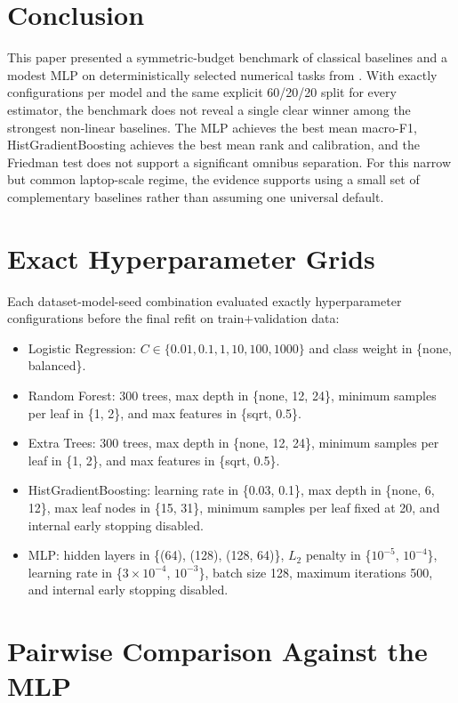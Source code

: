 \documentclass{ieeeaccess}
\begin{document}
\section{Conclusion}
This paper presented a symmetric-budget benchmark of classical baselines and a modest MLP on deterministically selected numerical tasks from \BenchmarkSuiteName{}. With exactly \SearchConfigsPerModel{} configurations per model and the same explicit 60/20/20 split for every estimator, the benchmark does not reveal a single clear winner among the strongest non-linear baselines. The MLP achieves the best mean macro-F1, HistGradientBoosting achieves the best mean rank and calibration, and the Friedman test does not support a significant omnibus separation. For this narrow but common laptop-scale regime, the evidence supports using a small set of complementary baselines rather than assuming one universal default.

\appendices
\section{Exact Hyperparameter Grids}
Each dataset-model-seed combination evaluated exactly \SearchConfigsPerModel{} hyperparameter configurations before the final refit on train$+$validation data:
\begin{itemize}
\item Logistic Regression: $C \in \{0.01, 0.1, 1, 10, 100, 1000\}$ and class weight in \{none, balanced\}.
\item Random Forest: 300 trees, max depth in \{none, 12, 24\}, minimum samples per leaf in \{1, 2\}, and max features in \{sqrt, 0.5\}.
\item Extra Trees: 300 trees, max depth in \{none, 12, 24\}, minimum samples per leaf in \{1, 2\}, and max features in \{sqrt, 0.5\}.
\item HistGradientBoosting: learning rate in \{0.03, 0.1\}, max depth in \{none, 6, 12\}, max leaf nodes in \{15, 31\}, minimum samples per leaf fixed at 20, and internal early stopping disabled.
\item MLP: hidden layers in \{(64), (128), (128, 64)\}, $L_2$ penalty in \{$10^{-5}$, $10^{-4}$\}, learning rate in \{$3 \times 10^{-4}$, $10^{-3}$\}, batch size 128, maximum iterations 500, and internal early stopping disabled.
\end{itemize}

\section{Pairwise Comparison Against the MLP}
\begin{table}[!t]
\caption{Pairwise aggregate comparison against the MLP baseline.}
\label{tab:vs-mlp}
\centering
\scriptsize
\resizebox{\columnwidth}{!}{}
\end{table}
\end{document}
